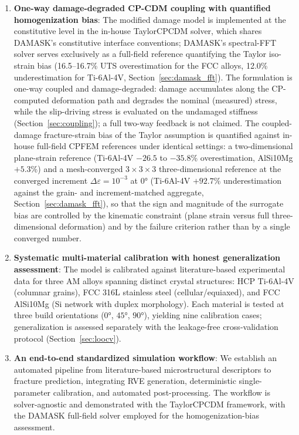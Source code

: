 \documentclass[twocolumn]{sagej}
\begin{document}
\begin{enumerate}
    \item \textbf{One-way damage-degraded CP-CDM coupling with quantified homogenization bias}: The modified damage model is implemented at the constitutive level in the in-house TaylorCPCDM solver, which shares DAMASK's constitutive interface conventions; DAMASK's spectral-FFT solver serves exclusively as a full-field reference quantifying the Taylor iso-strain bias (16.5--16.7\% UTS overestimation for the FCC alloys, 12.0\% underestimation for Ti-6Al-4V, Section~\ref{sec:damask_fft}). The formulation is one-way coupled and damage-degraded: damage accumulates along the CP-computed deformation path and degrades the nominal (measured) stress, while the slip-driving stress is evaluated on the undamaged stiffness (Section~\ref{sec:coupling}); a full two-way feedback is not claimed. The coupled-damage fracture-strain bias of the Taylor assumption is quantified against in-house full-field CPFEM references under identical settings: a two-dimensional plane-strain reference (Ti-6Al-4V $-26.5$ to $-35.8$\% overestimation, AlSi10Mg $+5.3$\%) and a mesh-converged $3\times3\times3$ three-dimensional reference at the converged increment $\Delta\varepsilon=10^{-3}$ at $\ang{0}$ (Ti-6Al-4V $+92.7$\% underestimation against the grain- and increment-matched aggregate, Section~\ref{sec:damask_fft}), so that the sign and magnitude of the surrogate bias are controlled by the kinematic constraint (plane strain versus full three-dimensional deformation) and by the failure criterion rather than by a single converged number.
    
    \item \textbf{Systematic multi-material calibration with honest generalization assessment}: The model is calibrated against literature-based experimental data for three AM alloys spanning distinct crystal structures: HCP Ti-6Al-4V (columnar grains), FCC 316L stainless steel (cellular/equiaxed), and FCC AlSi10Mg (Si network with duplex morphology). Each material is tested at three build orientations ($\ang{0}$, $\ang{45}$, $\ang{90}$), yielding nine calibration cases; generalization is assessed separately with the leakage-free cross-validation protocol (Section~\ref{sec:loocv}).
    
    \item \textbf{An end-to-end standardized simulation workflow}: We establish an automated pipeline from literature-based microstructural descriptors to fracture prediction, integrating RVE generation, deterministic single-parameter calibration, and automated post-processing. The workflow is solver-agnostic and demonstrated with the TaylorCPCDM framework, with the DAMASK full-field solver employed for the homogenization-bias assessment.
\end{enumerate}
\end{document}
